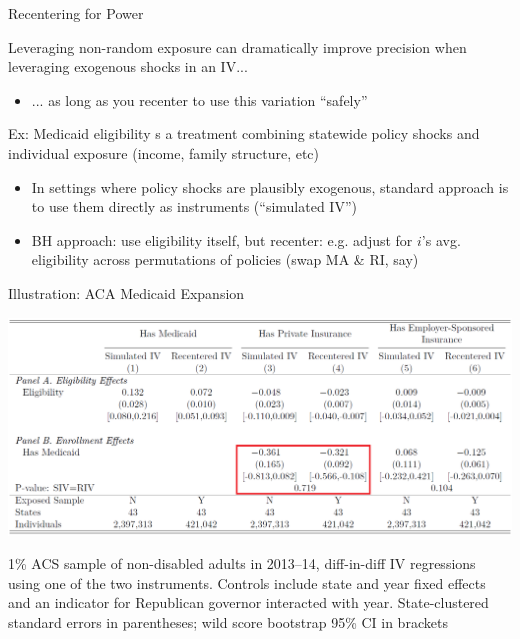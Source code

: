 \documentclass{beamer}
\begin{document}
\begin{frame}{Recentering for Power}

Leveraging non-random exposure can dramatically improve precision when leveraging exogenous shocks in an IV...
\begin{itemize}
\item ... as long as you recenter to use this variation ``safely''
\end{itemize}\medskip\pause{}

Ex: Medicaid eligibility s a treatment combining statewide policy shocks and individual exposure (income, family structure, etc)
\begin{itemize}
\item In settings where policy shocks are plausibly exogenous, standard approach is to use them directly as instruments (``simulated IV'')
\item BH approach: use eligibility itself, but recenter: e.g. adjust for $i$'s avg. eligibility across permutations of policies (swap MA \& RI, say)
\end{itemize}

\end{frame}

\begin{frame}{Illustration: ACA Medicaid Expansion}

	\begin{center}
	\includegraphics[width=1\textwidth]{lecture_includes/aca_ss.png}
	\end{center}

\footnotesize{1\% ACS sample of non-disabled adults in 2013--14, diff-in-diff IV regressions using one of the two instruments. Controls include state and year fixed effects and an indicator for Republican governor interacted with year. State-clustered standard errors in parentheses; wild score bootstrap 95\% CI in brackets} 

\end{frame}
\end{document}

